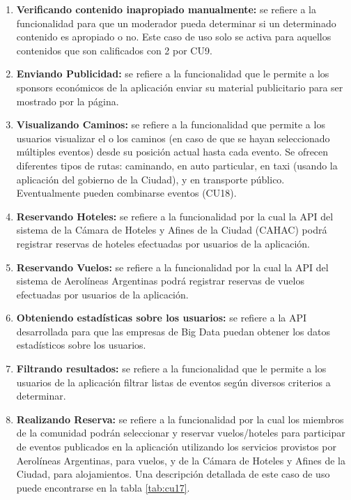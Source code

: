 \begin{enumerate}
  \item \textbf{Verificando contenido inapropiado manualmente:} se refiere a la funcionalidad para que un moderador pueda determinar si un determinado contenido es apropiado o no. Este caso de uso solo se activa para aquellos contenidos que son calificados con 2 por CU9.
  \item \textbf{Enviando Publicidad:} se refiere a la funcionalidad que le permite a los sponsors económicos de la aplicación enviar su material publicitario para ser mostrado por la página.
  \item \textbf{Visualizando Caminos:} se refiere a la funcionalidad que permite a los usuarios visualizar el o los caminos (en caso de que se hayan seleccionado múltiples eventos) desde su posición actual hasta cada evento. Se ofrecen diferentes tipos de rutas: caminando, en auto particular, en taxi (usando la aplicación del gobierno de la Ciudad), y en transporte público. Eventualmente pueden combinarse eventos (CU18).
  \item \textbf{Reservando Hoteles:} se refiere a la funcionalidad por la cual la API del sistema de la Cámara de Hoteles y Afines de la Ciudad (CAHAC) podrá registrar reservas de hoteles efectuadas por usuarios de la aplicación.
  \item \textbf{Reservando Vuelos:} se refiere a la funcionalidad por la cual la API del sistema de Aerolíneas Argentinas podrá registrar reservas de vuelos efectuadas por usuarios de la aplicación.
  \item  \textbf{Obteniendo estadísticas sobre los usuarios:} se refiere a la API desarrollada para que las empresas de Big Data puedan obtener los datos estadísticos sobre los usuarios.
  \item  \textbf{Filtrando resultados:} se refiere a la funcionalidad que le permite a los usuarios de la aplicación filtrar listas de eventos según diversos criterios a determinar.
  \item  \textbf{Realizando Reserva:} se refiere a la funcionalidad por la cual los miembros de la comunidad podrán seleccionar y reservar vuelos/hoteles para participar de eventos publicados en la aplicación utilizando los servicios provistos por Aerolíneas Argentinas, para vuelos, y de la Cámara de Hoteles y Afines de la Ciudad, para alojamientos. Una descripción detallada de este caso de uso puede encontrarse en la tabla \ref{tab:cu17}.
  \begin{table}[H]
  \centering
  \begin{tabularx}{\textwidth}{|X|X|}

\end{tabularx}
\end{table}
\end{enumerate}
